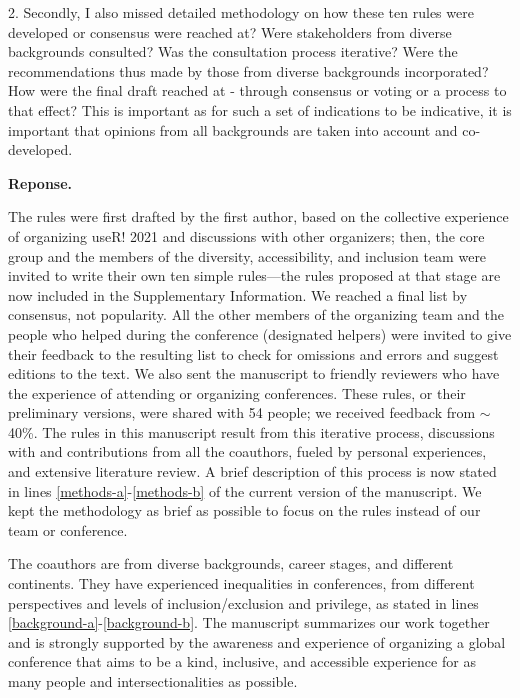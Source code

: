 \documentclass{article}
\newenvironment{Reply}{\noindent\color{BlueViolet}\textbf{Reponse.}}{\vspace{1em}}
\begin{document}
2. Secondly, I also missed detailed methodology on how these ten rules were developed or consensus were reached at? Were stakeholders from diverse backgrounds consulted? Was the consultation process iterative? Were the recommendations thus made by those from diverse backgrounds incorporated? How were the final draft reached at - through consensus or voting or a process to that effect? This is important as for such a set of indications to be indicative, it is important that opinions from all backgrounds are taken into account and co-developed.

\begin{Reply}

    The rules were first drafted by the first author, based on the collective experience of organizing useR! 2021 and discussions with other organizers; then, the core group and the members of the diversity, accessibility, and inclusion team were invited to write their own ten simple rules—the rules proposed at that stage are now included in the Supplementary Information.
    We reached a final list by consensus, not popularity. All the other members of the organizing team and the people who helped during the conference (designated helpers) were invited to give their feedback to the resulting list to check for omissions and errors and suggest editions to the text.
    We also sent the manuscript to friendly reviewers who have the experience of attending or organizing conferences. 
    These rules, or their preliminary versions, were shared with 54 people; we received feedback from $\sim$40\%.
    The rules in this manuscript result from this iterative process, discussions with and contributions from all the coauthors, fueled by personal experiences, and extensive literature review.
    A brief description of this process is now stated in lines \ref{methods-a}-\ref{methods-b} of the current version of the manuscript.
    We kept the methodology as brief as possible to focus on the rules instead of our team or conference. 
    
    The coauthors are from diverse backgrounds, career stages, and different continents. They have experienced inequalities in conferences, from different perspectives and levels of inclusion/exclusion and privilege, as stated in lines \ref{background-a}-\ref{background-b}.
    The manuscript summarizes our work together and is strongly supported by the awareness and experience of organizing a global conference that aims to be a kind, inclusive, and accessible experience for as many people and intersectionalities as possible.
\end{Reply}
\end{document}
